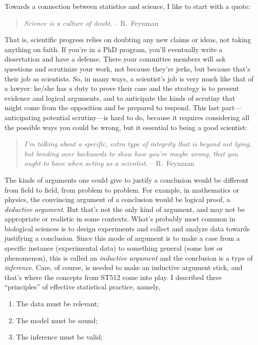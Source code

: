 \documentclass[a4paper, 12pt]{article}
\theoremstyle{plain}
\theoremstyle{definition}
\theoremstyle{remark}
\begin{document}
Towards a connection between statistics and science, I like to start with a quote:
\begin{quote}
{\em Science is a culture of doubt.} -- R.~Feynman
\end{quote}
That is, scientific progress relies on doubting any new claims or ideas, not taking anything on faith.  If you're in a PhD program, you'll eventually write a dissertation and have a defense.  There your committee members will ask questions and scrutinize your work, not because they're jerks, but because that's their job as scientists.  So, in many ways, a scientist's job is very much like that of a lawyer: he/she has a duty to prove their case and the strategy is to present evidence and logical arguments, and to anticipate the kinds of scrutiny that might come from the opposition and be prepared to respond.  This last part---anticipating potential scrutiny---is hard to do, because it requires considering all the possible ways you could be wrong, but it essential to being a good scientist:
\begin{quote}
{\em I'm talking about a specific, extra type of integrity that is beyond not lying, but bending over backwards to show how you're maybe wrong, that you ought to have when acting as a scientist.} -- R.~Feynman
\end{quote}
The kinds of arguments one could give to justify a conclusion would be different from field to field, from problem to problem.  For example, in mathematics or physics, the convincing argument of a conclusion would be logical proof, a {\em deductive argument}.  But that's not the only kind of argument, and may not be appropriate or realistic in some contexts.  What's probably most common in biological sciences is to design experiments and collect and analyze data towards justifying a conclusion.  Since this mode of argument is to make a case from a specific instance (experimental data) to something general (some law or phenomenon), this is called an {\em inductive argument} and the conclusion is a type of {\em inference}.  Care, of course, is needed to make an inductive argument stick, and that's where the concepts from ST512 come into play.  I described three ``principles'' of effective statistical practice, namely, 
\begin{enumerate}
\item The data must be relevant;
\item The model must be sound;
\item The inference must be valid;
\end{enumerate}
\end{document}
